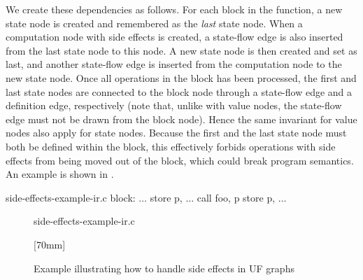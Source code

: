 We create these dependencies as follows.
%
For each \gls{block} in the \gls{function}, a new \gls{state node} is created
and remembered as the \emph{last} \gls{state node}.
%
When a \gls{computation node} with side effects is created, a \gls{state-flow
  edge} is also inserted from the last \gls{state node} to this \gls{node}.
%
A new \gls{state node} is then created and set as last, and another
\gls{state-flow edge} is inserted from the \gls{computation node} to the new
\gls{state node}.
%
Once all \glspl{operation} in the \gls{block} has been processed, the first and
last \glspl{state node} are connected to the \gls{block node} through a
\gls{state-flow edge} and a \gls{definition edge}, respectively (note that,
unlike with \glspl{value node}, the \gls{state-flow edge} must not be drawn from
the  \gls{block node}).
%
Hence the same invariant for \glspl{value node} also apply for \glspl{state
  node}.
%
Because the first and the last \gls{state node} must both be defined within the
\gls{block}, this effectively forbids \glspl{operation} with side effects from
being moved out of the \gls{block}, which could break \gls{program} semantics.
%
An example is shown in .
%
\begin{filecontents*}{side-effects-example-ir.c}
block:
  $\ldots$
  store p, $\ldots$
  call foo, p
  store p, $\ldots$
\end{filecontents*}
%
\begin{figure}
  \centering%
  \mbox{}%
  \hfill%
                {%
                  \begin{lstpage}{26mm}
                                    {side-effects-example-ir.c}%
                  \end{lstpage}%
                }%
  \hfill%
                [70mm]%
                {%
                }%
  \hfill%
  \mbox{}

  \caption{Example illustrating how to handle side effects in UF graphs}%
\end{figure}


